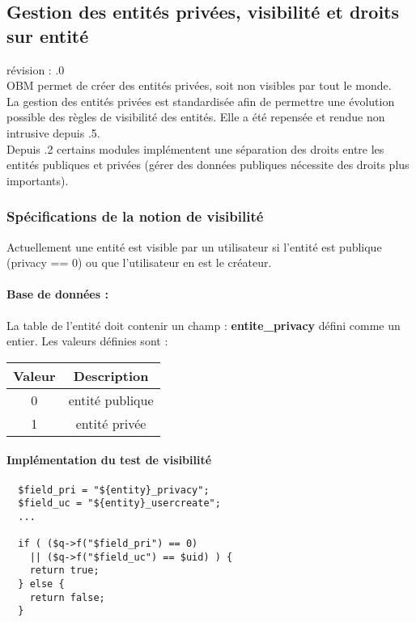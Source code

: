 

\subsection{Gestion des entités privées, visibilité et droits sur entité}
révision : .0\\

OBM permet de créer des entités privées, soit non visibles par tout le monde.\\

La gestion des entités privées est standardisée afin de permettre une évolution possible des règles de visibilité des entités.
Elle a été repensée et rendue non intrusive depuis .5.\\

Depuis .2 certains modules implémentent une séparation des droits entre les entités publiques et privées (gérer des données publiques nécessite des droits plus importants).


\subsubsection{Spécifications de la notion de visibilité}

Actuellement une entité est visible par un utilisateur si l'entité est publique (privacy == 0) ou que l'utilisateur en est le créateur.

\paragraph{Base de données :} La table de l'entité doit contenir un champ : \textbf{entite\_privacy} défini comme un entier.
Les valeurs définies sont :\\

\begin{tabular}{|c|c|}
\hline
\textbf{Valeur} & \textbf{Description} \\
\hline
0 & entité publique \\
\hline
1 & entité privée \\
\hline
\end{tabular}

\paragraph{Implémentation du test de visibilité}
\begin{verbatim}
  $field_pri = "${entity}_privacy";
  $field_uc = "${entity}_usercreate";
  ...

  if ( ($q->f("$field_pri") == 0)
    || ($q->f("$field_uc") == $uid) ) {
    return true;
  } else {
    return false;
  }
\end{verbatim}


